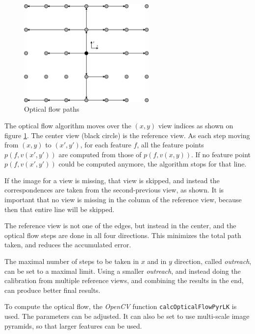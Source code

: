 \documentclass{scrreprt}
\begin{document}
\begin{figure}
\centering
\includegraphics[width=0.6\textwidth]{opticalflow.pdf}
\caption{Optical flow paths}
\label{fig:opticalflow}
\end{figure}

The optical flow algorithm moves over the $(x,y)$ view indices as shown on figure \ref{fig:opticalflow}. The center view (black circle) is the reference view. As each step moving from $(x,y)$ to $(x',y')$, for each feature $f$, all the feature points $p(f,v(x',y'))$ are computed from those of $p(f,v(x,y))$. If no feature point $p(f,v(x',y'))$ could be computed anymore, the algorithm stops for that line.

If the image for a view is missing, that view is skipped, and instead the correspondences are taken from the second-previous view, as shown. It is important that no view is missing in the column of the reference view, because then that entire line will be skipped.

The reference view is not one of the edges, but instead in the center, and the optical flow steps are done in all four directions. This minimizes the total path taken, and reduces the accumulated error.

The maximal number of steps to be taken in $x$ and in $y$ direction, called \emph{outreach}, can be set to a maximal limit. Using a smaller \emph{outreach}, and instead doing the calibration from multiple reference views, and combining the results in the end, can produce better final results.

To compute the optical flow, the \emph{OpenCV} function \texttt{calcOpticalFlowPyrLK} is used. The parameters can be adjusted. It can also be set to use multi-scale image pyramids, so that larger features can be used.
\end{document}
